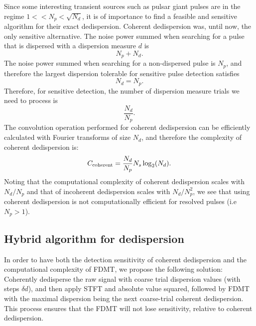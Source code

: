 \documentclass[iop]{emulateapj}
\begin{document}
Since some interesting transient sources such as pulsar giant pulses are in the regime $1<<{N_{p}}<\sqrt{{N_{d}}}$, it is of importance to find a feasible and sensitive algorithm for their exact dedispersion. 
Coherent dedispersion was, until now, the only sensitive alternative.
The noise power summed when searching for a pulse that is dispersed with a dispersion measure $d$ is \begin{equation} N_{p}+ N_d.\end{equation}
The noise power summed when searching for a non-dispersed pulse is $N_p$, and therefore the largest dispersion tolerable for sensitive pulse detection satisfies  \begin{equation}N_{d} = {N_{p}}.\end{equation}
Therefore, for sensitive detection, the number of dispersion measure trials we need to process is  
\begin{equation} \frac{N_d}{N_{p}}.\end{equation}
The convolution operation performed for coherent dedispersion can be efficiently calculated with Fourier transforms of size ${N_{d}}$, and therefore the complexity of coherent dedispersion is:
\begin{equation}
C_{\rm coherent} = \frac{{N_{d}}}{{N_{p}}}{N_{s}}\log_2({N_{d}}).
\end{equation}
Noting that the computational complexity of coherent dedispersion scales with $N_{d}/N_{p}$ and that of incoherent dedispersion scales with $N_{d}/{N_{p}^2}$, we see that using coherent dedispersion is not computationally efficient for resolved pulses (i.e $N_{p}>1$).

\subsection{Hybrid algorithm for dedispersion}
In order to have both the detection sensitivity of coherent dedispersion and the computational complexity of FDMT, we propose the following solution:
Coherently dedisperse the raw signal with coarse trial dispersion values (with steps $\delta{d}$), and then apply STFT and absolute value squared, followed by FDMT with the maximal dispersion being the next coarse-trial coherent dedispersion.
This process ensures that the FDMT will not lose sensitivity,
relative to coherent dedispersion.
\end{document}
